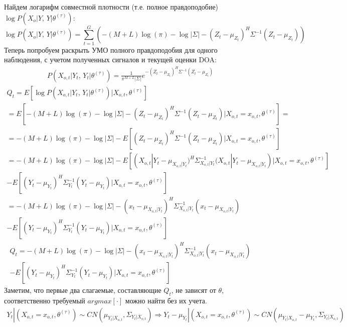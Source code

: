 \documentclass[11pt]{article}
\begin{document}
Найдем логарифм совместной плотности (т.е. полное правдоподобие) $\log P(X_o|Y, \, Y|\theta^{(\tau)})$:
\begin{equation*}
\log P(X_o|Y, \, Y|\theta^{(\tau)}) = \sum_{t=1}^G \left(-(M+L)\log(\pi)-\log|\Sigma|-(Z_t-\mu_{Z_t})^H\Sigma^{-1}(Z_t-\mu_{Z_t})\right)
\end{equation*}
Теперь попробуем раскрыть УМО полного правдоподобия для одного наблюдения, с учетом полученных сигналов и текущей оценки DOA:
\begin{gather}
P(X_{o,t}|Y_t, \, Y_t|\theta^{(\tau)}) = \frac{1}{\pi^{M+L}|\Sigma|}e^{-(Z_t-\mu_{Z_t})^H\Sigma^{-1}(Z_t-\mu_{Z_t})}
\end{gather}
\begin{gather*}
Q_t = E[\log P(X_{o,t}|Y_t, \, Y_t|\theta^{(\tau)})|X_{o,t}, \theta^{(\tau)}] \\ = E[-(M+L)\log(\pi)-\log|\Sigma|-(Z_t-\mu_{Z_t})^H\Sigma^{-1}(Z_t-\mu_{Z_t})|X_{o,t}=x_{o,t}, \theta^{(\tau)}] = \\
=-(M+L)\log(\pi)-\log|\Sigma| - E[(Z_t-\mu_{Z_t})^H\Sigma^{-1}(Z_t-\mu_{Z_t})|X_{o,t}=x_{o,t}, \theta^{(\tau)}] \\
=-(M+L)\log(\pi)-\log|\Sigma|  -   E[(X_{o,t}|Y_t-\mu_{X_{o,t}|Y_t})^H\Sigma_{X_{o,t}|Y_t}^{-1}(X_{o,t}|Y_t-\mu_{X_{o,t}|Y_t})|X_{o,t}=x_{o,t}, \theta^{(\tau)}] 
\\- E[(Y_t-\mu_{Y_t})^H\Sigma_{Y_t}^{-1}(Y_t-\mu_{Y_t})|X_{o,t}=x_{o,t}, \theta^{(\tau)}] \\
=-(M+L)\log(\pi)-\log|\Sigma| - (x_t-\mu_{X_{o,t}|Y_t})^H\Sigma_{X_{o,t}|Y_t}^{-1}(x_t-\mu_{X_{o,t}|Y_t})\\ - E[(Y_t-\mu_{Y_t})^H\Sigma_{Y_t}^{-1}(Y_t-\mu_{Y_t})|X_{o,t}=x_{o,t},\theta^{(\tau)}] 
\end{gather*}
\begin{equation}
\begin{gathered}
Q_t = -(M+L)\log(\pi)-\log|\Sigma| - (x_t-\mu_{X_{o,t}|Y_t})^H\Sigma_{X_{o,t}|Y_t}^{-1}(x_t-\mu_{X_{o,t}|Y_t}) \\ - E[(Y_t-\mu_{Y_t})^H\Sigma_{Y_t}^{-1}(Y_t-\mu_{Y_t})|X_{o,t}=x_{o,t},\theta^{(\tau)}] 
\end{gathered}
\end{equation}
Заметим, что первые два слагаемые, составляющие $Q_t$, не зависят от $\theta$, соответственно требуемый $argmax [\cdot]$ можно найти без их учета.
\begin{gather*}
Y_t|(X_{o,t}=x_{o,t}, \theta^{(\tau)}) \sim CN(\mu_{Y_t|X_{o,t}}, \Sigma_{Y_t|X_{o,t}}) \Rightarrow Y_t-\mu_{Y_t}|(X_{o,t}=x_{o,t}, \theta^{(\tau)}) \sim CN(\mu_{Y_t|X_{o,t}}-\mu_{Y_t}, \Sigma_{Y_t|X_{o,t}})
\end{gather*}
\end{document}
